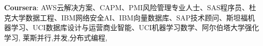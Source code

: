 \textbf{Coursera}: AWS云解决方案、CAPM、PMI风险管理专业人士、SAS程序员、杜克大学数据工程、IBM网络安全AI、IBM向量数据库、SAP技术顾问、斯坦福机器学习、UCI数据库设计与运营商业智能、UCI机器学习数学、阿尔伯塔大学强化学习, 莱斯并行,并发,分布式编程,

